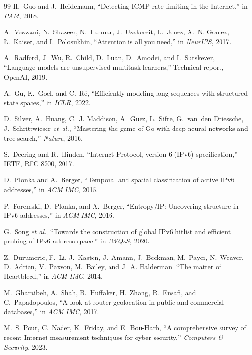 \documentclass[conference]{IEEEtran}
\begin{document}
\begin{thebibliography}{99}
H.~Guo and J.~Heidemann,
``Detecting ICMP rate limiting in the Internet,''
in \emph{PAM}, 2018.



A.~Vaswani, N.~Shazeer, N.~Parmar, J.~Uszkoreit, L.~Jones,
A.~N. Gomez, {\L}.~Kaiser, and I.~Polosukhin,
``Attention is all you need,''
in \emph{NeurIPS}, 2017.

A.~Radford, J.~Wu, R.~Child, D.~Luan, D.~Amodei, and I.~Sutskever,
``Language models are unsupervised multitask learners,''
Technical report, OpenAI, 2019.

A.~Gu, K.~Goel, and C.~R\'e,
``Efficiently modeling long sequences with structured state spaces,''
in \emph{ICLR}, 2022.

D.~Silver, A.~Huang, C.~J. Maddison, A.~Guez, L.~Sifre, G.~van~den
Driessche, J.~Schrittwieser \emph{et~al.},
``Mastering the game of Go with deep neural networks and tree
search,''
\emph{Nature}, 2016.

S.~Deering and R.~Hinden,
``Internet Protocol, version 6 (IPv6) specification,''
IETF, RFC 8200, 2017.

D.~Plonka and A.~Berger,
``Temporal and spatial classification of active IPv6 addresses,''
in \emph{ACM IMC}, 2015.

P.~Foremski, D.~Plonka, and A.~Berger,
``Entropy/IP: Uncovering structure in IPv6 addresses,''
in \emph{ACM IMC}, 2016.

G.~Song \emph{et al.},
``Towards the construction of global IPv6 hitlist and efficient probing
of IPv6 address space,''
in \emph{IWQoS}, 2020.

Z.~Durumeric, F.~Li, J.~Kasten, J.~Amann, J.~Beekman, M.~Payer,
N.~Weaver, D.~Adrian, V.~Paxson, M.~Bailey, and J.~A. Halderman,
``The matter of Heartbleed,''
in \emph{ACM IMC}, 2014.

M.~Gharaibeh, A.~Shah, B.~Huffaker, H.~Zhang, R.~Ensafi, and
C.~Papadopoulos,
``A look at router geolocation in public and commercial databases,''
in \emph{ACM IMC}, 2017.

M.~S. Pour, C.~Nader, K.~Friday, and E.~Bou-Harb,
``A comprehensive survey of recent Internet measurement techniques
for cyber security,''
\emph{Computers \& Security}, 2023.


\end{thebibliography}
\end{document}
